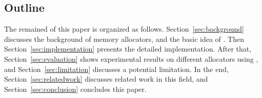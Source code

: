 \subsection*{Outline}

The remained of this paper is organized as follows. Section~\ref{sec:background} discusses the background of memory allocators, and the basic idea of \MP{}. Then Section~\ref{sec:implementation} presents the detailed implementation. After that, Section~\ref{sec:evaluation} shows experimental results on different allocators using \MP{}, and Section~\ref{sec:limitation} discusses a potential limitation. In the end, Section~\ref{sec:relatedwork} discusses related work in this field, and Section~\ref{sec:conclusion} concludes this paper.
